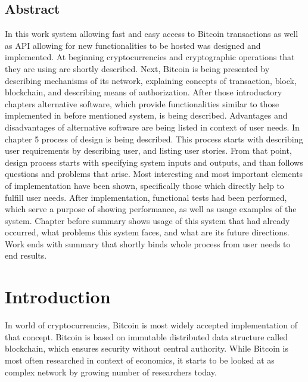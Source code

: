 \documentclass[12pt, en, eng, oneside, final]{mgr}
\begin{document}
\section*{Abstract}

In this work system allowing fast and easy access to Bitcoin transactions as well as API allowing for new functionalities to be hosted was designed and implemented. At beginning cryptocurrencies and cryptographic operations that they are using are shortly described. Next, Bitcoin is being presented by describing mechanisms of its network, explaining concepts of transaction, block, blockchain, and describing means of authorization. After those introductory chapters alternative software, which provide functionalities similar to those implemented in before mentioned system, is being described. Advantages and disadvantages of alternative software are being listed in context of user needs. In chapter 5 process of design is being described. This process starts with describing user requirements by describing user, and listing user stories. From that point, design process starts with specifying system inputs and outputs, and than follows questions and problems that arise. Most interesting and most important elements of implementation have been shown, specifically those which directly help to fulfill user needs. After implementation, functional tests had been performed, which serve a purpose of showing performance, as well as usage examples of the system. Chapter before summary shows usage of this system that had already occurred, what problems this system faces, and what are its future directions. Work ends with summary that shortly binds whole process from user needs to end results.

\chapter{Introduction}

In world of cryptocurrencies, Bitcoin is most widely accepted implementation of that concept. Bitcoin is based on immutable distributed data structure called blockchain, which ensures security without central authority. While Bitcoin is most often researched in context of economics, it starts to be looked at as complex network by growing number of researchers today. 
\end{document}
